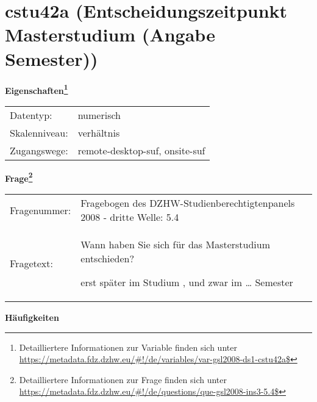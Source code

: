 
    \setcounter{footnote}{0}

    \vspace*{-1.8cm}
	\section{cstu42a (Entscheidungszeitpunkt Masterstudium (Angabe Semester))}
	\label{section:cstu42a}



    \vspace*{0.5cm}
    \noindent\textbf{Eigenschaften\footnote{Detailliertere Informationen zur Variable finden sich unter
		\url{https://metadata.fdz.dzhw.eu/\#!/de/variables/var-gsl2008-ds1-cstu42a$}}}\\
	\begin{tabularx}{\hsize}{@{}lX}
	Datentyp: & numerisch \\
	Skalenniveau: & verhältnis \\
	Zugangswege: &
	  remote-desktop-suf, 
	  onsite-suf
 \\
    \end{tabularx}



				\vspace*{0.5cm}
                \noindent\textbf{Frage\footnote{Detailliertere Informationen zur Frage finden sich unter
		              \url{https://metadata.fdz.dzhw.eu/\#!/de/questions/que-gsl2008-ins3-5.4$}}}\\
				\begin{tabularx}{\hsize}{@{}lX}
					Fragenummer: &
					  Fragebogen des DZHW-Studienberechtigtenpanels 2008 - dritte Welle:
					  5.4
 \\
					Fragetext: & Wann haben Sie sich für das Masterstudium entschieden?\par  erst später im Studium , und zwar im … Semester \\
				\end{tabularx}





        		\vspace*{0.5cm}
                \noindent\textbf{Häufigkeiten}

